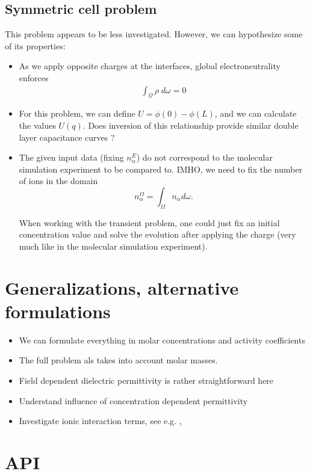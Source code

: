 \documentclass[12pt,oneside,reqno]{amsart}
\begin{document}
\subsection{Symmetric cell problem}
This problem appears to be less investigated.
However, we can hypothesize some of its properties:
\begin{itemize}
  \item As we apply opposite charges at the interfaces, global electroneutrality  enforces
        \begin{align}
          \label{eq:globneutral}
          \int_\Omega \rho\; d\omega  =0
        \end{align}
  \item For this problem, we can define $U=\phi(0)-\phi(L)$, and we can calculate the values
        $U(q)$. Does inversion of this relationship provide similar double layer capacitance curves ?
  \item The given input data (fixing $n_\alpha^E$) do not correspond to the molecular simulation
        experiment to be compared to. IMHO, we need to fix the number of ions in the domain
        $$n_\alpha^{\Omega} = \int_\Omega n_\alpha d\omega.$$

        When working with the transient problem, one could just fix an initial concentration
        value and solve the evolution after applying the charge (very much like in the molecular
        simulation experiment). 
\end{itemize}



\section{Generalizations, alternative formulations}
\begin{itemize}
  \item We can formulate everything in molar concentrations and activity coefficients 
  \item The full problem als takes into account molar masses. 
  \item Field dependent dielectric permittivity is rather straightforward here
        \cite{landstorfer2022thermodynamic}
  \item Understand influence of concentration dependent permittivity
        \cite{landstorfer2022thermodynamic}
  \item Investigate ionic interaction terms, see e.g. \cite{bazant2011double}, \cite{SchammerPhD2023}
\end{itemize}

\section{API}




\end{document}
